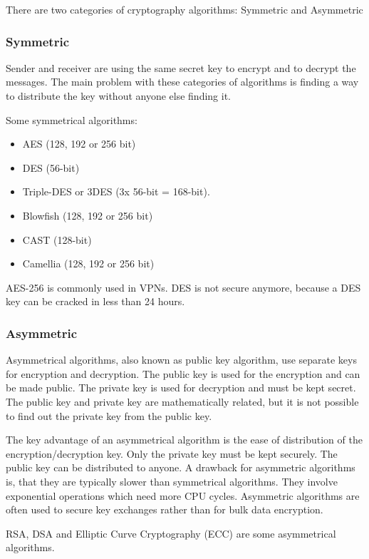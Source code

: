 \documentclass[a4paper]{report}
\begin{document}
There are two categories of cryptography algorithms: Symmetric and Asymmetric

\subsubsection{Symmetric}
\label{sssec:symmetric}
Sender and receiver are using the same secret key to encrypt and to decrypt the messages. The main problem with these categories of algorithms is finding a way to distribute the key without anyone else finding it.

Some symmetrical algorithms:
\begin{itemize}
	\item AES (128, 192 or 256 bit)
	\item DES (56-bit)
	\item Triple-DES or 3DES (3x 56-bit = 168-bit).
	\item Blowfish (128, 192 or 256 bit)
	\item CAST (128-bit)
	\item Camellia (128, 192 or 256 bit)
\end{itemize}
AES-256 is commonly used in VPNs. DES is not secure anymore, because a DES key can be cracked in less than 24 hours. \parencite{Bollapragada2005}

\subsubsection{Asymmetric}
\label{sssec:asymmetric}
Asymmetrical algorithms, also known as public key algorithm, use separate keys for encryption and decryption. The public key is used for the encryption and can be made public. The private key is used for decryption and must be kept secret. The public key and private key are mathematically related, but it is not possible to find out the private key from the public key. 

The key advantage of an asymmetrical algorithm is the ease of distribution of the encryption/decryption key. Only the private key must be kept securely. The public key can be distributed to anyone.
A drawback for asymmetric algorithms is, that they are typically slower than symmetrical algorithms. They involve exponential operations which need more CPU cycles. Asymmetric algorithms are often used to secure key exchanges rather than for bulk data encryption.

RSA, DSA and Elliptic Curve Cryptography (ECC) are some asymmetrical algorithms. \parencite{Bollapragada2005}
\end{document}
